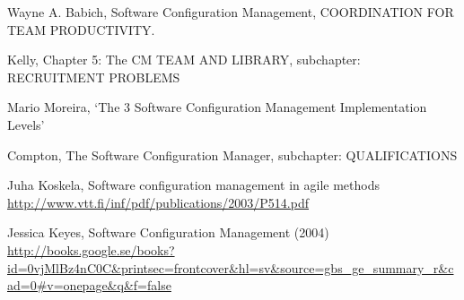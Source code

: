 \documentclass[10pt]{article}
\begin{document}
\begin{thebibliography}{1}
 Wayne A. Babich, Software Configuration Management, COORDINATION FOR TEAM PRODUCTIVITY.

 Kelly, Chapter 5: The CM TEAM AND LIBRARY, subchapter: RECRUITMENT PROBLEMS 

 Mario Moreira, ‘The 3 Software Configuration Management Implementation Levels’

Compton, The Software Configuration Manager, subchapter: QUALIFICATIONS

Juha Koskela, Software configuration management in agile methods
\url{http://www.vtt.fi/inf/pdf/publications/2003/P514.pdf}

 Jessica Keyes, Software Configuration Management (2004) \url{http://books.google.se/books?id=0vjMlBz4nC0C&printsec=frontcover&hl=sv&source=gbs_ge_summary_r&cad=0#v=onepage&q&f=false}
\end{thebibliography}
\end{document}
